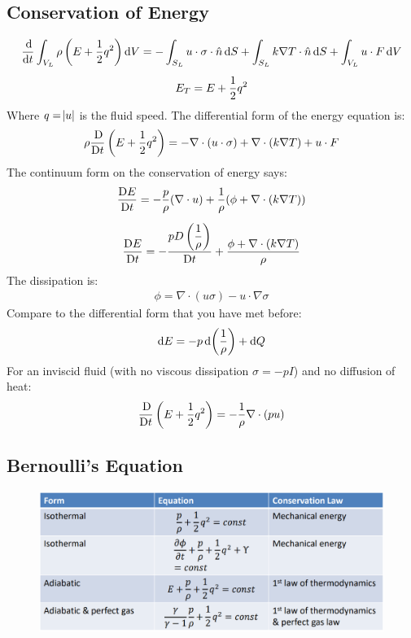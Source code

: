 \documentclass[class=report, crop=false, 12pt,a4paper]{standalone}
\begin{document}
\subsection{Conservation of Energy}
\begin{gather}
    \frac{\dif}{\dif t} \int_{V_L} \rho \left( E + \frac{1}{2}q^2 \right) \dif V = -\int_{S_L} u \cdot \sigma \cdot \hat{n} \dif S + \int_{S_L} k \nabla T \cdot \hat{n} \dif S + \int_{V_L} u \cdot F \dif V \\[5pt]
    E_T = E + \frac{1}{2}q^2
\end{gather}
Where $q = \abs{u}$ is the fluid speed. The differential form of the energy equation is: 
\begin{gather}
    \rho \frac{\Dif}{\Dif t} \left( E + \frac{1}{2}q^2 \right) = -\nabla \cdot (u \cdot \sigma) + \nabla \cdot (k\nabla T) + u \cdot F
\end{gather}
The continuum form on the conservation of energy says: 
\begin{gather}
    \frac{\Dif E}{\Dif t} = -\frac{p}{\rho}(\nabla\cdot u) + \frac{1}{\rho}(\phi + \nabla \cdot (k\nabla T)) \\[5pt]
    \frac{\Dif E}{\Dif t} = -\dfrac{pD\left(\dfrac{1}{\rho}\right)}{\Dif t} + \frac{\phi + \nabla \cdot (k\nabla T)}{\rho}
\end{gather}
The dissipation is: 
\begin{gather}
    \phi = \nabla \cdot (u\sigma) - u\cdot \nabla \sigma
\end{gather}
Compare to the differential form that you have met before: 
\begin{gather}
    \dif E = -p \dif \left(\frac{1}{\rho}\right) + \dif Q
\end{gather}
For an inviscid fluid (with no viscous dissipation $\sigma = -pI$) and no diffusion of heat: 
\begin{gather}
    \frac{\Dif}{\Dif t} \left( E + \frac{1}{2}q^2 \right) = -\frac{1}{\rho}\nabla \cdot (pu)
\end{gather}
\subsection{Bernoulli’s Equation}
\begin{figure}[H]
    \centering
    \includegraphics[width = 0.95 \textwidth]{../img/diagram3.PNG} 
    \caption{}
\end{figure}
\end{document}

